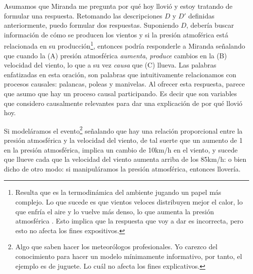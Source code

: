 Asumamos que Miranda me pregunta por qué hoy llovió y estoy tratando
de formular una respuesta. Retomando las descripciones $D$ y $D'$
definidas anteriormente, puedo formular dos respuestas. Suponiendo
$D$, debería buscar información de cómo se producen los vientos y si
la presión atmoférica está relacionada en su producción\footnote{
	Resulta que es la termodinámica del ambiente jugando un papel más
	complejo. Lo que sucede es que vientos veloces distribuyen mejor el
	calor, lo que enfría el aire y lo vuelve más denso, lo que aumenta la
	presión atmosférica \parencite{Spiridonov2021}. Esto implica que la
	respuesta que voy a dar es incorrecta, pero esto no afecta los fines
	expositivos.
},
entonces podría responderle a Miranda señalando que cuando la (A) presión
atmosférica \emph{aumenta}, \emph{produce} cambios en la (B) velocidad del
viento, lo que a su vez \emph{causa} que (C) llueva. Las palabras
enfatizadas en esta oración, son palabras que intuitivamente relacionamos
con procesos causales: palancas, poleas y manivelas. Al ofrecer esta
respuesta, parece que asumo que hay un proceso causal participando. Es
decir que son variables que considero causalmente relevantes para dar una
explicación de por qué llovió hoy.

Si modeláramos el evento\footnote{
	Algo que saben hacer los meteorólogos profesionales. Yo carezco del
	conocimiento para hacer un modelo	mínimamente informativo, por tanto, el
	ejemplo es de juguete. Lo cuál	no afecta los fines explicativos.
}
señalando que hay una relación proporcional entre la presión atmosférica y
la velocidad del viento, de tal suerte que un aumento de 1 en la presión
atmosférica, implica un cambio de 10km/h en el viento, y sucede que llueve
cada que la velocidad del viento aumenta arriba de los 85km/h: o bien
dicho de otro modo: si manipuláramos la presión atmosférica, entonces
llovería.

